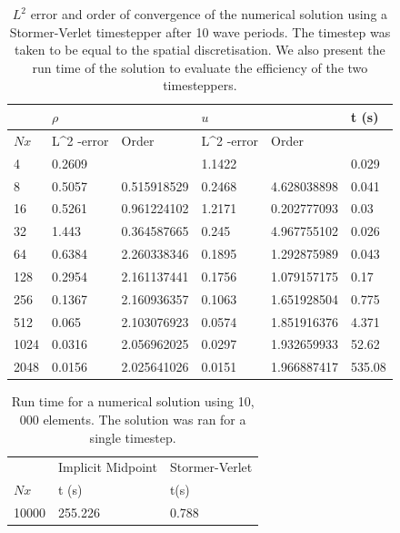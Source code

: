 \documentclass[a4paper,11pt]{article}
\begin{document}
\begin{table}[]
\centering
\caption{$L^2$ error and order of convergence of the numerical solution using a Stormer-Verlet timestepper after 10 wave periods. The timestep was taken to be equal to the spatial discretisation. We also present the run time of the solution to evaluate the efficiency of the two timesteppers.  }
\label{sverror}
\begin{tabular}{@{}llllll@{}}
\toprule
     & \multicolumn{2}{l}{$\rho$}               & \multicolumn{2}{l}{$u$}                  & t (s)  \\ \midrule
$Nx$ & L\textasciicircum 2 -error & Order       & L\textasciicircum 2 -error & Order       &        \\
 \toprule
4    & 0.2609                     &             & 1.1422                     &             & 0.029  \\
8    & 0.5057                     & 0.515918529 & 0.2468                     & 4.628038898 & 0.041  \\
16   & 0.5261                     & 0.961224102 & 1.2171                     & 0.202777093 & 0.03   \\
32   & 1.443                      & 0.364587665 & 0.245                      & 4.967755102 & 0.026  \\
64   & 0.6384                     & 2.260338346 & 0.1895                     & 1.292875989 & 0.043  \\
128  & 0.2954                     & 2.161137441 & 0.1756                     & 1.079157175 & 0.17   \\
256  & 0.1367                     & 2.160936357 & 0.1063                     & 1.651928504 & 0.775  \\
512  & 0.065                      & 2.103076923 & 0.0574                     & 1.851916376 & 4.371  \\
1024 & 0.0316                     & 2.056962025 & 0.0297                     & 1.932659933 & 52.62  \\
2048 & 0.0156                     & 2.025641026 & 0.0151                     & 1.966887417 & 535.08 \\ \bottomrule
\end{tabular}
\end{table}




\begin{table}[]
\centering
\caption{Run time for a numerical solution using 10, 000 elements. The solution was ran for a single timestep. }
\label{stresstest}
\begin{tabular}{@{}lll@{}}
      & Implicit Midpoint & Stormer-Verlet \\
$Nx$  & t (s)             & t(s)           \\
10000 & 255.226           & 0.788         
\end{tabular}
\end{table}
\end{document}
